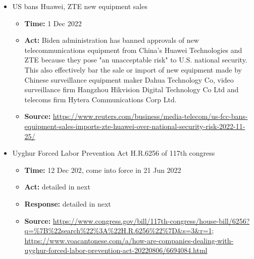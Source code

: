 \begin{itemize}
			\item US bans Huawei, ZTE new equipment sales
				\begin{itemize}
				\item \textbf{Time: }1 Dec 2022
				\item \textbf{Act: }Biden administration has banned approvals of new telecommunications equipment from China's Huawei Technologies and ZTE because they pose "an unacceptable risk" to U.S. national security. This also effectively bar the sale or import of new equipment made by Chinese surveillance equipment maker Dahua Technology Co, video surveillance firm Hangzhou Hikvision Digital Technology Co Ltd and telecoms firm Hytera Communications Corp Ltd.
				\item	\textbf{Source: }\url{https://www.reuters.com/business/media-telecom/us-fcc-bans-equipment-sales-imports-zte-huawei-over-national-security-risk-2022-11-25/}
				\end{itemize}

			\item	 Uyghur Forced Labor Prevention Act H.R.6256 of 117th congress
				\begin{itemize}
				\item \textbf{Time: }12 Dec 202, come into force in 21 Jun 2022
				\item \textbf{Act: } detailed in next
				\item \textbf{Response: } detailed in next
				\item	\textbf{Source: } \url{https://www.congress.gov/bill/117th-congress/house-bill/6256?q=\%7B\%22search\%22\%3A\%22H.R.6256\%22\%7D\&s=3\&r=1}; \url{https://www.voacantonese.com/a/how-are-companies-dealing-with-uyghur-forced-labor-prevention-act-20220806/6694084.html}
				\end{itemize}
				

\end{itemize}
